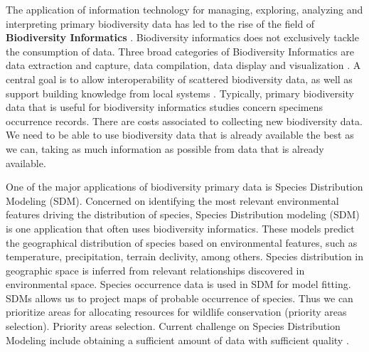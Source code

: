 The application of information technology for managing, exploring, analyzing and interpreting primary biodiversity data has led to the rise of the field of \textbf{Biodiversity Informatics} \cite{Soberon2004}.
Biodiversity informatics does not exclusively tackle the consumption of data.
Three broad categories of Biodiversity Informatics are data extraction and capture, data compilation, data display and visualization \cite{Peterson2010}.
A central goal is to allow interoperability of scattered biodiversity data, as well as support building knowledge from local systems \cite{Bisby2000}.
Typically, primary biodiversity data that is useful for biodiversity informatics studies concern specimens occurrence records.
There are costs associated to collecting new biodiversity data.
We need to be able to use biodiversity data that is already available the best as we can, taking as much information as possible from data that is already available.











One of the major applications of biodiversity primary data is Species Distribution Modeling (SDM).
Concerned on identifying the most relevant environmental features driving the distribution of species, Species Distribution modeling (SDM) is one application that often uses biodiversity informatics.
These models predict the geographical distribution of species based on environmental features, such as temperature, precipitation, terrain declivity, among others.
Species distribution in geographic space is inferred from relevant relationships discovered in environmental space.
Species occurrence data is used in SDM for model fitting. 
SDMs allows us to project maps of probable occurrence of species.
Thus we can prioritize areas for allocating resources for wildlife conservation (priority areas selection).
Priority areas selection. %
Current challenge on Species Distribution Modeling include obtaining a sufficient amount of data with sufficient quality \cite{Araujo2006}.










